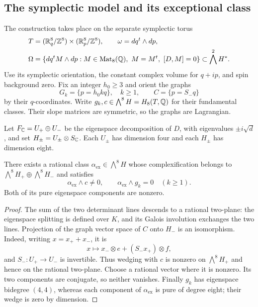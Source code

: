 \subsection{The symplectic model and its exceptional class}

The construction takes place on the separate symplectic torus
\begin{equation}
 \begin{split}
 T&=(\mathbb R^8_q/\mathbb Z^8)\times(\mathbb R^8_p/\mathbb Z^8),\qquad
       \omega=dq^t\wedge dp,\\
 \Omega&=\{dq^tM\wedge dp:M\in\operatorname{Mat}_8(\mathbb Q),\
                    M=M^t,\ [D,M]=0\}
       \subset\bigwedge^2H^*.
 \end{split}
 \label{hodge:omega-space}
\end{equation}
Use its symplectic orientation, the constant complex volume for $q+ip$,
and spin background zero.  Fix an integer $h_0\ge3$ and orient the graphs
\begin{equation}
 G_k=\{p=h_0kq\},\quad k\ge1,\qquad C=\{p=S_-q\}
 \label{hodge:graph-classes}
\end{equation}
by their $q$-coordinates.  Write $g_k,c\in\bigwedge^8H=H_8(T,\mathbb Q)$
for their fundamental classes.  Their slope matrices are symmetric, so
the graphs are Lagrangian.

Let $F_\mathbb C=U_+\oplus U_-$ be the eigenspace decomposition of $D$, with
eigenvalues $\pm i\sqrt d$, and set $H_\pm=U_\pm\otimes S_\mathbb C$.
Each $U_\pm$ has dimension four and each $H_\pm$ has dimension eight.

\begin{lemma}
\label{hodge:exceptional-homology}
There exists a rational class $\alpha_{\mathrm{ex}}\in\bigwedge^8H$
whose complexification belongs to
$\bigwedge^8H_+\oplus\bigwedge^8H_-$ and satisfies
\begin{equation}
 \alpha_{\mathrm{ex}}\wedge c\ne0,
 \qquad \alpha_{\mathrm{ex}}\wedge g_k=0\quad(k\ge1).
 \label{hodge:exceptional-pairings}
\end{equation}
Both of its pure eigenspace components are nonzero.
\end{lemma}

\begin{proof}
The sum of the two determinant lines descends to a rational two-plane:
the eigenspace splitting is defined over $K$, and its Galois involution
exchanges the two lines.  Projection of the graph vector space of $C$
onto $H_-$ is an isomorphism.  Indeed, writing $x=x_++x_-$, it is
\[
 x\longmapsto x_-\otimes e+(S_-x_+)\otimes f,
\]
and $S_-:U_+\to U_-$ is invertible.  Thus wedging with $c$ is nonzero
on $\bigwedge^8H_+$ and hence on the rational two-plane.  Choose a rational
vector where it is nonzero.  Its two components are conjugate, so neither
vanishes.  Finally $g_k$ has eigenspace bidegree $(4,4)$, whereas each
component of $\alpha_{\mathrm{ex}}$ is pure of degree eight; their wedge
is zero by dimension.
\end{proof}

